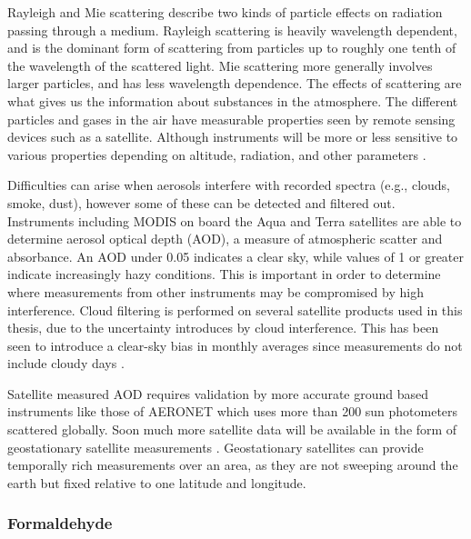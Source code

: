     
    Rayleigh and Mie scattering describe two kinds of particle effects on radiation passing through a medium.
    Rayleigh scattering is heavily wavelength dependent, and is the dominant form of scattering from particles up to roughly one tenth of the wavelength of the scattered light.
    Mie scattering more generally involves larger particles, and has less wavelength dependence.
    The effects of scattering are what gives us the information about substances in the atmosphere.
    The different particles and gases in the air have measurable properties seen by remote sensing devices such as a satellite. Although instruments will be more or less sensitive to various properties depending on altitude, radiation, and other parameters \parencite[e.g.,][]{Martin2002}.
    
    Difficulties can arise when aerosols interfere with recorded spectra (e.g., clouds, smoke, dust), however some of these can be detected and filtered out.
    Instruments including MODIS on board the Aqua and Terra satellites are able to determine aerosol optical depth (AOD), a measure of atmospheric scatter and absorbance. 
    An AOD under 0.05 indicates a clear sky, while values of 1 or greater indicate increasingly hazy conditions.
    This is important in order to determine where measurements from other instruments may be compromised by high interference.
    Cloud filtering is performed on several satellite products used in this thesis, due to the uncertainty introduces by cloud interference. 
    This has been seen to introduce a clear-sky bias in monthly averages since measurements do not include cloudy days \parencite{Surl2018}.
    
    Satellite measured AOD requires validation by more accurate ground based instruments like those of AERONET which uses more than 200 sun photometers scattered globally.
    Soon much more satellite data will be available in the form of geostationary satellite measurements \parencite{Kwon2017}.
    Geostationary satellites can provide temporally rich measurements over an area, as they are not sweeping around the earth but fixed relative to one latitude and longitude.
    
    \subsubsection{Formaldehyde}
      
